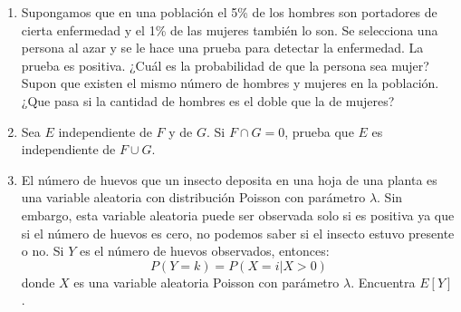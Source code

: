 \documentclass{report}
\begin{document}
\begin{enumerate}
    \item Supongamos que en una población el 5\% de los hombres son portadores de cierta enfermedad y el 1\% de las mujeres también lo son. Se selecciona una persona al azar y se le hace una prueba para detectar la enfermedad. La prueba es positiva. ¿Cuál es la probabilidad de que la persona sea mujer? Supon que existen el mismo número de hombres y mujeres en la población. ¿Que pasa si la cantidad de hombres es el doble que la de mujeres?
    
    \item Sea $E$ independiente de $F$ y de $G$. Si $F\cap G = 0$, prueba que $E$ es independiente de $F\cup G$.
    \item El número de huevos que un insecto deposita en una hoja de una planta es una variable aleatoria con distribución Poisson con parámetro $\lambda$. Sin embargo, esta variable aleatoria puede ser observada solo si es positiva ya que si el número de huevos es cero, no podemos saber si el insecto estuvo presente o no. Si $Y$ es el número de huevos observados, entonces:
    $$
    P(Y=k)=P(X=i\vert X > 0)
    $$
    donde $X$ es una variable aleatoria Poisson con parámetro $\lambda$. Encuentra $E[Y]$.
 



\end{enumerate}
\end{document}
